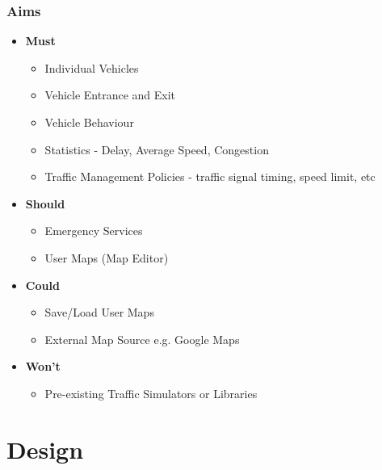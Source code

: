 \documentclass{beamer}
\begin{document}
\begin{frame}
\frametitle{Aims }

\begin{itemize}
\item \textbf{Must}
	\begin{itemize}
		\item Individual Vehicles
		\item Vehicle Entrance and Exit 
		\item Vehicle Behaviour
		\item Statistics - Delay, Average Speed, Congestion
		\item Traffic Management Policies - traffic signal timing, speed limit, etc
\end{itemize}

\item \textbf{Should}
	\begin{itemize}
		\item Emergency Services
		\item User Maps (Map Editor)
	\end{itemize}
\item \textbf{Could}
	\begin{itemize}
		\item Save/Load User Maps
		\item External Map Source e.g. Google Maps
		\end{itemize}
\item \textbf{Won't}
	\begin{itemize}
		\item Pre-existing Traffic Simulators or Libraries
	\end{itemize}	
\end{itemize}

\end{frame}

\section{Design}
\end{document}
